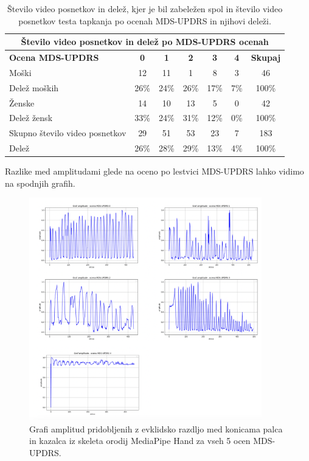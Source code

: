 \documentclass[a4paper,12pt]{article}
\begin{document}
\begin{table}[H]
  \centering
  \renewcommand{\arraystretch}{1.3} 
  \begin{longtable}{|l|c|c|c|c|c|c|}
      \hline
      \multicolumn{7}{|c|}{\textbf{Število video posnetkov in delež po MDS-UPDRS ocenah}} \\
      \hline
      \textbf{Ocena MDS-UPDRS} & \textbf{0} & \textbf{1} & \textbf{2} & \textbf{3} & \textbf{4} & \textbf{Skupaj} \\
      \hline
      Moški & 12 & 11 & 1  & 8  & 3  & 46 \\
      Delež moških & 26\% & 24\% & 26\% & 17\% & 7\%  & 100\% \\
      Ženske & 14 & 10 & 13 & 5  & 0  & 42 \\
      Delež žensk & 33\% & 24\% & 31\% & 12\% & 0\%  & 100\% \\
      Skupno število video posnetkov & 29 & 51 & 53 & 23 & 7  & 183 \\
      Delež & 26\% & 28\% & 29\% & 13\% & 4\%  & 100\% \\
      \hline
  \end{longtable}
  \caption{Število video posnetkov in delež, kjer je bil zabeležen spol in število video posnetkov testa tapkanja 
  po ocenah MDS-UPDRS in njihovi deleži.}
  \label{tab:video_posnetki}
\end{table}

Razlike med amplitudami glede na oceno po lestvici MDS-UPDRS lahko vidimo na spodnjih grafih. \\

\begin{figure}[H]
  \centering
  \includegraphics[width=0.9\textwidth]{slike/ocene.png}  
  \caption{Grafi amplitud pridobljenih z evklidsko razdljo med konicama palca in kazalca iz skeleta orodij 
  MediaPipe Hand za vseh 5 ocen MDS-UPDRS.}
  \label{fig:amplitude_ocene}
\end{figure}
\end{document}
